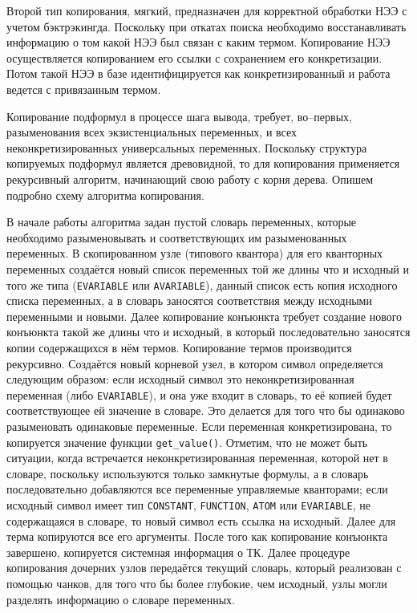 Второй тип копирования, мягкий, предназначен для корректной обработки НЭЭ с учетом бэктрэкингда. Поскольку при откатах поиска необходимо восстанавливать информацию о том какой НЭЭ был связан с каким термом. Копирование НЭЭ осуществляется копированием его ссылки с сохранением его конкретизации. Потом такой НЭЭ в базе идентифицируется как конкретизированный и работа ведется с привязанным термом.

Копирование подформул в процессе шага вывода, требует, во--первых, разыменования всех экзистенциальных переменных, и всех неконкретизированных универсальных переменных. Поскольку структура копируемых подформул является древовидной, то для копирования применяется рекурсивный алгоритм, начинающий свою работу с корня дерева. Опишем подробно схему алгоритма копирования.

В начале работы алгоритма задан пустой словарь переменных, которые необходимо разыменовывать и соответствующих им разыменованных переменных. В скопированном узле (типового квантора) для его кванторных переменных создаётся новый список переменных той же длины что и исходный и того же типа (\texttt{EVARIABLE} или \texttt{AVARIABLE}), данный список есть копия исходного списка переменных, а в словарь заносятся соответствия между исходными переменными и новыми. Далее копирование конъюнкта требует создание нового конъюнкта такой же длины что и исходный, в который последовательно заносятся копии содержащихся в нём термов. Копирование термов производится рекурсивно. Создаётся новый корневой узел, в котором символ определяется следующим образом:  если исходный символ это неконкретизированная переменная (либо \texttt{EVARIABLE}), и она уже входит в словарь, то её копией будет соответствующее ей значение в словаре. Это делается для того что бы одинаково разыменовать одинаковые переменные. Если переменная конкретизирована, то копируется значение функции {\tt get\_value()}. Отметим, что не может быть ситуации, когда встречается неконкретизированная переменная, которой нет в словаре, поскольку используются только замкнутые формулы, а в словарь последовательно добавляются все переменные управляемые кванторами; если исходный символ имеет тип \texttt{CONSTANT}, \texttt{FUNCTION}, \texttt{ATOM} или \texttt{EVARIABLE}, не содержащаяся в словаре, то новый символ есть ссылка на исходный. Далее для терма копируются все его аргументы. После того как копирование конъюнкта завершено, копируется системная информация о ТК. Далее процедуре копирования дочерних узлов передаётся текущий словарь, который реализован с помощью чанков, для того что бы более глубокие, чем исходный, узлы могли разделять информацию о словаре переменных.


